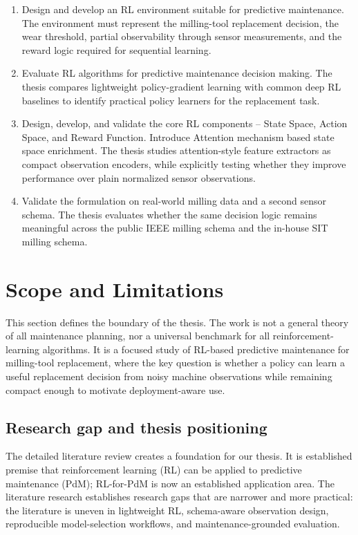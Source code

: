 \documentclass[12pt,oneside]{book}
\begin{document}
\begin{enumerate}[leftmargin=*,label=\textbf{Objective-\arabic*}]
	\item Design and develop an RL environment suitable for predictive maintenance. The environment must represent the milling-tool replacement decision, the wear threshold, partial observability through sensor measurements, and the reward logic required for sequential learning.
	\item Evaluate RL algorithms for predictive maintenance decision making. The thesis compares lightweight policy-gradient learning with common deep RL baselines to identify practical policy learners for the replacement task.
	\item Design, develop, and validate the core RL components – State Space, Action Space, and Reward Function. Introduce Attention mechanism based state space enrichment. The thesis studies attention-style feature extractors as compact observation encoders, while explicitly testing whether they improve performance over plain normalized sensor observations.
	\item Validate the formulation on real-world milling data and a second sensor schema. The thesis evaluates whether the same decision logic remains meaningful across the public IEEE milling schema and the in-house SIT milling schema.
\end{enumerate}

\section{Scope and Limitations}
This section defines the boundary of the thesis. The work is not a general theory of all maintenance planning, nor a universal benchmark for all reinforcement-learning algorithms. It is a focused study of RL-based predictive maintenance for milling-tool replacement, where the key question is whether a policy can learn a useful replacement decision from noisy machine observations while remaining compact enough to motivate deployment-aware use.

\subsection{Research gap and thesis positioning}\label{sec:intro-gap-positioning}

The detailed literature review creates a foundation for our thesis. It is established premise that reinforcement learning (RL) can be applied to predictive maintenance (PdM); RL-for-PdM is now an established application area. The literature research establishes research gaps that are narrower and more practical: the literature is uneven in lightweight RL, schema-aware observation design, reproducible model-selection workflows, and maintenance-grounded evaluation.
\end{document}
